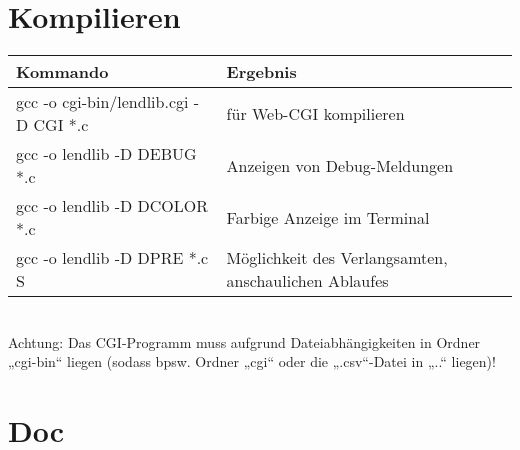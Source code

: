 \section{Kompilieren}

\begin{tabular}{l l}
Kommando & Ergebnis\\
\hline
gcc -o cgi-bin/lendlib.cgi -D CGI *.c & für Web-CGI kompilieren \\
gcc -o lendlib -D DEBUG *.c & Anzeigen von Debug-Meldungen\\
gcc -o lendlib -D DCOLOR *.c & Farbige Anzeige im Terminal\\
gcc -o lendlib -D DPRE *.c S & Möglichkeit des Verlangsamten, anschaulichen Ablaufes\\
\end{tabular}\medskip\\
Achtung: Das CGI-Programm muss aufgrund Dateiabhängigkeiten in Ordner „cgi-bin“ liegen (sodass bpsw. Ordner „cgi“ oder die „.csv“-Datei in „..“ liegen)!

\section{Doc}


